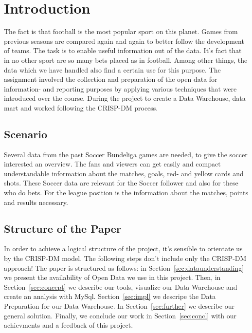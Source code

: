 \documentclass[11pt, journal]{IEEEtran}
\begin{document}


\section{Introduction}
\label{sec:intro}
The fact is that football is the most popular sport on this planet. Games from previous seasons are compared again and again to better follow the development of teams. 
The task is to enable useful information out of the data. It’s fact that in no other sport are so many bets placed as in football. Among other things, the data which we have handled also find a certain use for this purpose. The assignment involved the collection and preparation of the open data for information- and reporting purposes by applying various techniques that were introduced over the course. During the project to create a Data Warehouse, data mart and worked following the CRISP-DM process.

\subsection{Scenario} \label{subsec:scenario}
Several data from the past Soccer Bundeliga games are needed, to give the soccer interested an overview. The fans and viewers can get easily and compact understandable information about the matches, goals, red- and yellow cards and shots. These Soccer data are relevant for the Soccer follower and also for these who do bets. For the league position is the information about the matches, points and results necessary. 

\subsection{Structure of the Paper} \label{subsec:struct}
In order to achieve a logical structure of the project, it’s sensible to orientate us by  the CRISP-DM model. The following steps don’t include only the CRISP-DM approach!
The paper is structured as follows: in Section~\ref{sec:dataunderstanding} we present the availability of Open Data we use in this project.
Then, in Section~\ref{sec:concept} we describe our tools, visualize our Data Warehouse and create an analysis with MySql. Section~\ref{sec:impl} we descripe the Data Preparation for our Data Warehouse. In Section~\ref{sec:further} we describe our general solution. Finally, we conclude our work in Section~\ref{sec:concl} with our achievments and a feedback of this project.
\end{document}

